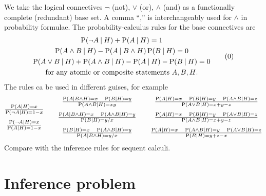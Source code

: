 \documentclass[\ifafour a4paper,12pt,\else a5paper,10pt,\fi%
onecolumn,oneside,article,%
british%
]{memoir}
\theoremstyle{remark}
\theoremstyle{innote}
\renewcommand*{\P}{\mathrm{P}}%
\renewcommand*{\|}[1][]{\nonscript\:#1\vert\nonscript\:\mathopen{}}
\newcommand*{\chap}{ch.}%
\newcommand*{\eg}{{e.g.}}
\begin{document}
We take the logical connectives $\lnot$ (not), $\lor$ (or), $\land$ (and) as a functionally complete (redundant) base set. A comma \enquote{,} is interchangeably used for $\land$ in probability formulae. The probability-calculus rules for the base connectives are
\begin{equation}
  \begin{gathered}
\P(\lnot A\|H) + \P(A \|H) = 1
\\
\P(A\land B \|H) - \P(A\|B\land H) \, \P(B\| H)= 0
  \\
  \P(A\lor B \|H) + \P(A\land B \|H) -\P(A\|H)-  \P(B\| H)=0
  \\
  \text{for any atomic or composite statements $A,B,H$.}
\end{gathered}
\tag{0}\label{eq:Prules}
\end{equation}
The rules ca be used in different guises, for example
\begin{equation*}
  \begin{gathered}
    \textstyle
    \frac{\P(A\|H) = x}{\P(\lnot A \|H) = 1-x}
  \\[\jot]
    \textstyle
  \frac{\P(\lnot A\|H) = x}{\P(A \|H) = 1-x}
\end{gathered}\qquad
  \begin{gathered}
  \textstyle
  \frac{\P(A\|B\land H) = x \quad \P(B\| H)=y}{\P(A\land B \|H) = x y}
  \\[\jot]
  \textstyle
 \frac{\P(A\|B\land H) = x \quad \P(A\land B \|H)=y}{\P(B\| H)=y/x}
\\[\jot]
  \textstyle
 \frac{\P(B\| H) = x \quad \P(A\land B \|H)=y}{\P(A\| B\land H)=y/x}
\end{gathered}\qquad
  \begin{gathered}
\textstyle
  \frac{\P(A\|H) = x \quad \P(B\| H)=y \quad
  \P(A\land B \|H)=z}{\P(A\lor B \|H) = x+y-z}
\\[\jot]
\textstyle
  \frac{\P(A\|H) = x \quad \P(B\| H)=y \quad
  \P(A\lor B \|H)=z}{\P(A\land B \|H) = x+y-z}
\\[\jot]
\textstyle
  \frac{\P(A\|H) = x \quad \P(A\land B \|H) = y\quad 
  \P(A\lor B \|H)=z }{\P(B\| H)=y+z-x}
\end{gathered}
\end{equation*}
Compare with the inference rules for sequent calculi.\autocites[\eg][\chap~1]{huthetal2000_r2004}[App.~A]{prawitz1965}[see also][]{boricic2020}

\section{Inference problem}
\label{sec:inference}
\end{document}
